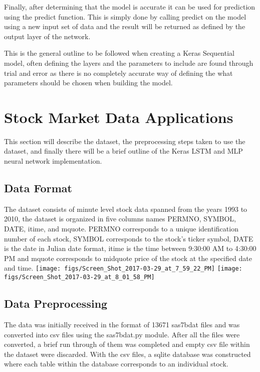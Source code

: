 \documentclass[twocolumn]{webofc}
\begin{document}
Finally, after determining that the model is accurate it can be used for prediction using the predict function. This is simply done by calling predict on the model using a new input set of data and the result will be returned as defined by the output layer of the network. 

This is the general outline to be followed when creating a Keras Sequential model, often defining the layers and the parameters to include are found through trial and error as there is no completely accurate way of defining the what parameters should be chosen when building the model. 

\section{Stock Market Data Applications}\label{data}

This section will describe the dataset, the preprocessing steps taken to use the dataset, and finally there will be a brief outline of the Keras LSTM and MLP neural network implementation. 

\subsection{Data Format}\label{sec:data}
The dataset consists of minute level stock data spanned from the years 1993 to 2010, the dataset is organized in five columns names PERMNO, SYMBOL, DATE, itime, and mquote. PERMNO corresponds to a unique identification number of each stock, SYMBOL corresponds to the stock's ticker symbol, DATE is the date in Julian date format, itime is the time between 9:30:00 AM to 4:30:00 PM and mquote corresponds to midquote price of the stock at the specified date and time. 
\texttt{[image: figs/Screen\_Shot\_2017-03-29\_at\_7\_59\_22\_PM]}
\texttt{[image: figs/Screen\_Shot\_2017-03-29\_at\_8\_01\_58\_PM]}
\subsection{Data Preprocessing}\label{sec:data}
The data was initially received in the format of 13671 sas7bdat files and was converted into csv files using the sas7bdat.py module. After all the files were converted, a brief run through of them was completed and empty csv file within the dataset were discarded. With the csv files, a sqlite database was constructed where each table within the database corresponds to an individual stock. 
\end{document}
